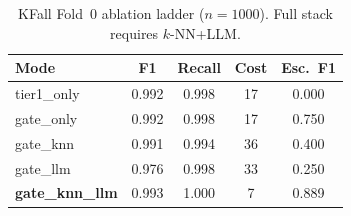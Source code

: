\begin{table}[!t]
\centering
\caption{KFall Fold~0 ablation ladder ($n{=}1000$). Full stack requires $k$-NN+LLM.}
\label{tab:kfallablation}
\begin{tabular}{lcccc}
\toprule
Mode & F1 & Recall & Cost & Esc.\ F1 \\
\midrule
tier1\_only & 0.992 & 0.998 & 17 & 0.000 \\
gate\_only & 0.992 & 0.998 & 17 & 0.750 \\
gate\_knn & 0.991 & 0.994 & 36 & 0.400 \\
gate\_llm & 0.976 & 0.998 & 33 & 0.250 \\
\textbf{gate\_knn\_llm} & 0.993 & 1.000 & 7 & 0.889 \\
\bottomrule
\end{tabular}
\end{table}
